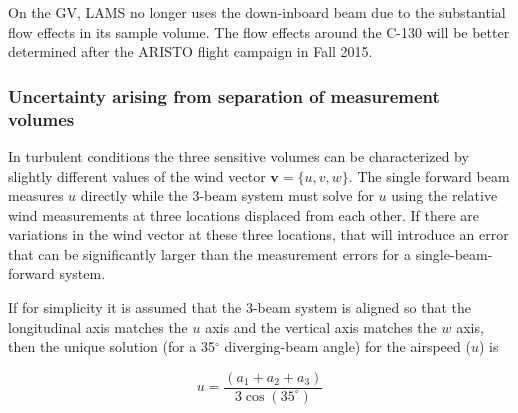 \documentclass[12pt,twoside,english]{article}\usepackage[]{graphicx}\usepackage[]{color}
\let\OrgIndex\index
\renewcommand*{\index}[1]{\OrgIndex{#1}}
\begin{document}
{{On the GV, LAMS no longer uses the down-inboard beam due to the substantial flow effects in its sample volume. The flow effects around the C-130 will be better determined after the ARISTO flight campaign in Fall 2015. 

\subsubsection{Uncertainty arising from separation of measurement volumes}


In turbulent conditions  the three sensitive volumes can be characterized by slightly different values of the wind vector $\mathbf{v}=\{u,v,w\}.$ The single forward beam measures $u$ directly while the 3-beam system must solve for $u$ using the relative wind measurements at three locations displaced from each other. If there are variations in the wind vector at these three locations, that will introduce an error that can be significantly larger than the measurement errors for a single-beam-forward system. 

If for simplicity it is assumed that the 3-beam system is aligned so that the longitudinal axis matches the $u$ axis and the vertical axis matches the $w$ axis, then the unique solution (for a 35$^{\circ}$ diverging-beam angle) for the airspeed ($u$) is 

\begin{equation}
u=\frac{(a_{1}+a_{2}+a_{3})}{3\cos(35^{\circ})}\label{eq:TAS3beam} 
\end{equation}


}}
\end{document}
